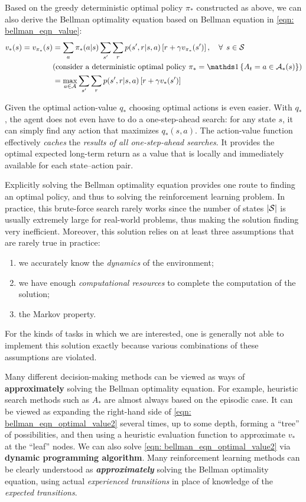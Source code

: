 \documentclass[11pt]{article}
\begin{document}
Based on the greedy deterministic optimal policy $\pi_{*}$ constructed as above, we can also derive the Bellman optimality equation based on Bellman equation in \eqref{eqn: bellman_eqn_value}:
\begin{align*}
v_{*}(s) = v_{\pi_{*}}(s) &= \sum_{a}\pi_{*}(a|s)\sum_{s'}\sum_{r}p(s', r| s, a)\brac{r + \gamma v_{\pi_{*}}(s')}, \quad \forall\,\; s\in \cS \\
&(\text{consider a deterministic optimal policy } \pi_{*} = \ind{A_{t} = a \in \cA_{*}(s)})\\
&= \max_{a \in \cA}\sum_{s'}\sum_{r}p(s', r| s, a)\brac{r + \gamma v_{*}(s')}
\end{align*}



Given the optimal action-value $q_{*}$  choosing optimal actions is even easier. With $q_{*}$, the agent does not even have to do a one-step-ahead search: for any state $s$, it can simply find any action that maximizes $q_{*}(s,a)$. The action-value function effectively \emph{caches} the \emph{results of all one-step-ahead searches}. It provides the optimal expected long-term return as a value that is locally and immediately available for each state–action pair.

Explicitly solving the Bellman optimality equation provides one route to finding an optimal policy, and thus to solving the reinforcement learning problem. In practice, this brute-force search rarely works since the number of states $|{\mathcal S}|$ is usually extremely large for real-world problems, thus making the solution finding very inefficient. Moreover, this solution relies on at least three assumptions that are rarely true in practice: 
\begin{enumerate}
\item we accurately know the \emph{dynamics} of the environment;
\item we have enough\emph{ computational resources} to complete the computation of the solution;
\item the Markov property.
\end{enumerate} For the kinds of tasks in which we are interested, one is generally not able to implement this solution exactly because various combinations of these assumptions are violated. 

Many different decision-making methods can be viewed as ways of \textbf{approximately} solving the Bellman optimality equation. For example, heuristic search methods such as $A_{*}$ are almost always based on the episodic case. It can be viewed as expanding the right-hand side of \eqref{eqn: bellman_eqn_optimal_value2} several times, up to some depth, forming a “tree” of possibilities, and then using a heuristic evaluation function to approximate $v_{*}$ at the “leaf” nodes. We can also solve \eqref{eqn: bellman_eqn_optimal_value2} via \textbf{dynamic programming algorithm}.  Many reinforcement learning methods can be clearly understood as \emph{\textbf{approximately}} solving the Bellman optimality equation, using actual \emph{experienced transitions} in place of knowledge of the \emph{expected transitions}. 

\newpage


\end{document}
